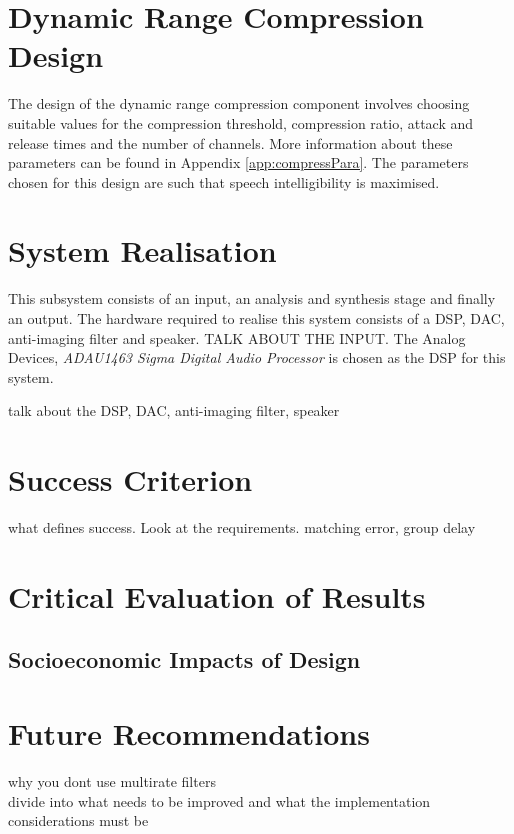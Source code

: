 \documentclass[11pt,onecolumn]{witseiepaper}
\begin{document}
\section{Dynamic Range Compression Design}

\noindent The design of the dynamic range compression component involves choosing suitable values for the compression threshold, compression ratio, attack and release times and the number of channels. More information about these parameters can be found in Appendix \ref{app:compressPara}. The parameters chosen for this design are such that speech intelligibility is maximised.


\section{System Realisation}

\noindent This subsystem consists of an input, an analysis and synthesis stage and finally an output. The hardware required to realise this system consists of a DSP, DAC, anti-imaging filter and speaker. TALK ABOUT THE INPUT. The Analog Devices, \textit{ADAU1463 Sigma Digital Audio Processor} is chosen as the DSP for this system.


talk about the DSP, DAC, anti-imaging filter, speaker




\section{Success Criterion}

what defines success. Look at the requirements. matching error, group delay

\section{Critical Evaluation of Results}



\subsection{Socioeconomic Impacts of Design}

\section{Future Recommendations}

why you dont use multirate filters\\
divide into what needs to be improved and what the implementation considerations must be
\end{document}
